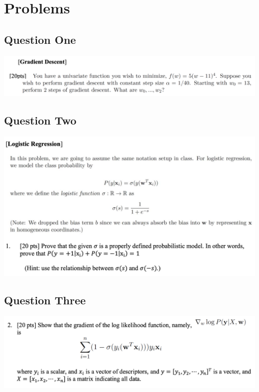 \section{Problems}

\subsection{Question One}
\includegraphics[width=1\textwidth]{media/hw4_q1.png}

\subsection{Question Two}
\includegraphics[width=1\textwidth]{media/hw4_q2.png}

\subsection{Question Three}
\includegraphics[width=1\textwidth]{media/hw4_q3.png}